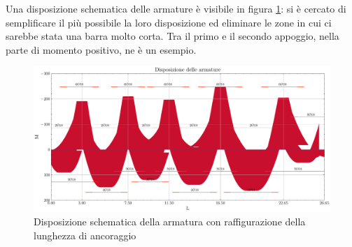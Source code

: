 Una disposizione schematica delle armature è visibile in figura \ref{fig:ULS_M_ULS_M_DisposioneArmature}: si è cercato di semplificare il più possibile la loro disposizione ed eliminare le zone in cui ci sarebbe stata una barra molto corta. 
Tra il primo e il secondo appoggio, nella parte di momento positivo, ne è un esempio.
\begin{figure}[htb]
  \centering
  \includegraphics[width=\textwidth]{IMG/ULS_M_DisposioneArmature.pdf}
  \caption{Disposizione schematica della armatura con raffigurazione della lunghezza di ancoraggio}
  \label{fig:ULS_M_ULS_M_DisposioneArmature}
\end{figure}